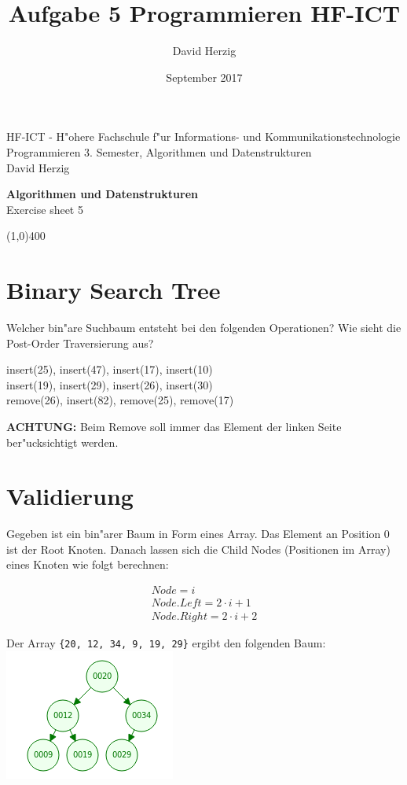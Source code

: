 \documentclass[a4paper,10pt]{article}
\title{Aufgabe 5 Programmieren HF-ICT}
\author{David Herzig}
\date{September 2017}
\begin{document}
HF-ICT - H"ohere Fachschule f"ur Informations- und Kommunikationstechnologie\\
Programmieren 3. Semester, Algorithmen und Datenstrukturen\\
David Herzig

\vspace{2mm}

\begin{center}
{\Large \bf Algorithmen und Datenstrukturen}\\
Exercise sheet 5
\end{center}

\vspace{2mm}

\line(1,0){400}

\vspace{5mm}

\section{Binary Search Tree}
Welcher bin"are Suchbaum entsteht bei den folgenden Operationen?
Wie sieht die Post-Order Traversierung aus?

\vspace{3mm}

insert(25), insert(47), insert(17), insert(10)\\
insert(19), insert(29), insert(26), insert(30)\\
remove(26), insert(82), remove(25), remove(17)

\vspace{3mm}

{\bf ACHTUNG:} Beim Remove soll immer das Element der linken Seite ber"ucksichtigt werden.


\section{Validierung}
Gegeben ist ein bin"arer Baum in Form eines Array. Das Element an Position 0 ist der Root Knoten.
Danach lassen sich die Child Nodes (Positionen im Array) eines Knoten wie folgt berechnen:

\begin{gather}
Node = i\\
Node.Left = 2 \cdot i + 1\\
Node.Right = 2 \cdot i + 2
\end{gather}

Der Array \verb|{20, 12, 34, 9, 19, 29}| ergibt den folgenden Baum:\\
\vspace{3mm}
\includegraphics[scale=0.7]{tree}
\vspace{3mm}
\end{document}
